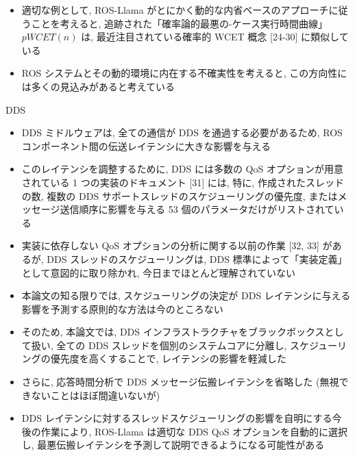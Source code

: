 \begin{frame}{}
    \begin{itemize}
        \item 適切な例として, ROS-Llama がとにかく動的な内省ベースのアプローチに従うことを考えると, 追跡された「確率論的最悪の-ケース実行時間曲線」 $p W C E T(n)$ は, 最近注目されている確率的 WCET 概念 [24-30] に類似している
\item ROS システムとその動的環境に内在する不確実性を考えると, この方向性には多くの見込みがあると考えている
    \end{itemize}
\end{frame}

\begin{frame}{DDS}
    \begin{itemize}
        \item DDS ミドルウェアは, 全ての通信が DDS を通過する必要があるため, ROS コンポーネント間の伝送レイテンシに大きな影響を与える
\item このレイテンシを調整するために, DDS には多数の QoS オプションが用意されている 1 つの実装のドキュメント [31] には, 特に, 作成されたスレッドの数, 複数の DDS サポートスレッドのスケジューリングの優先度, またはメッセージ送信順序に影響を与える 53 個のパラメータだけがリストされている
\item 実装に依存しない QoS オプションの分析に関する以前の作業 [32, 33] があるが, DDS スレッドのスケジューリングは, DDS 標準によって「実装定義」として意図的に取り除かれ, 今日までほとんど理解されていない
\item 本論文の知る限りでは, スケジューリングの決定が DDS レイテンシに与える影響を予測する原則的な方法は今のところない
    \end{itemize}
\end{frame}

\begin{frame}{}
    \begin{itemize}
        \item そのため, 本論文では, DDS インフラストラクチャをブラックボックスとして扱い, 全ての DDS スレッドを個別のシステムコアに分離し, スケジューリングの優先度を高くすることで, レイテンシの影響を軽減した
\item さらに, 応答時間分析で DDS メッセージ伝搬レイテンシを省略した (無視できないことはほぼ間違いないが)
\item DDS レイテンシに対するスレッドスケジューリングの影響を自明にする今後の作業により, ROS-Llama は適切な DDS QoS オプションを自動的に選択し, 最悪伝搬レイテンシを予測して説明できるようになる可能性がある
    \end{itemize}
\end{frame}



